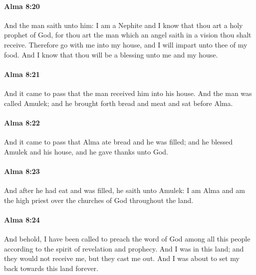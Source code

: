 		\paragraph{Alma 8:20} %
			\label{ALMA-8-20}

			And the man saith unto him:
			I am a Nephite and I know that thou art a holy prophet of God,
			for thou art the man which an angel saith in a vision
			thou shalt receive.
			Therefore go with me into my house,
			and I will impart unto thee of my food.
			And I know that thou will be a blessing unto me and my house.

		\paragraph{Alma 8:21} %
			\label{ALMA-8-21}

			And it came to pass that the man received him into his house.
			And the man was called Amulek;
			and he brought forth bread and meat and sat before Alma.

		\paragraph{Alma 8:22} %
			\label{ALMA-8-22}

			And it came to pass that Alma ate bread and he was filled;
			and he blessed Amulek and his house, and he gave thanks unto God.

		\paragraph{Alma 8:23} %
			\label{ALMA-8-23}

			And after he had eat and was filled, he saith unto Amulek:
			I am Alma and am the high priest over the churches of God throughout the land.

		\paragraph{Alma 8:24} %
			\label{ALMA-8-24}

			And behold, I have been called to preach the word of God among all this people
			according to the spirit of revelation and prophecy.
			And I was in this land;
			and they would not receive me, but they cast me out.
			And I was about to set my back towards this land forever.

